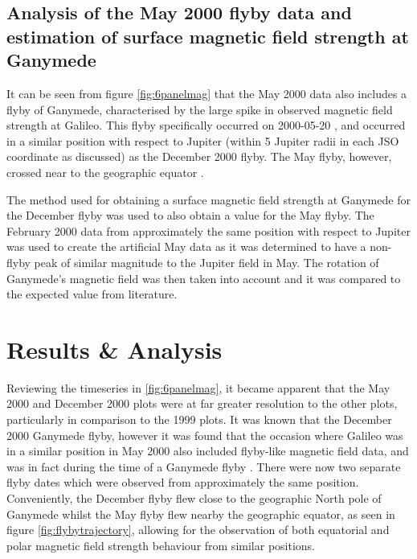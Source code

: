 \documentclass[11pt]{article}
\begin{document}
\subsection{Analysis of the May 2000 flyby data and estimation of surface magnetic field strength at Ganymede}
It can be seen from figure \ref{fig:6panelmag} that the May 2000 data also includes a flyby of Ganymede, characterised by the large spike in observed magnetic field strength at Galileo. This flyby specifically occurred on 2000-05-20 \cite{nasaflybys}, and occurred in a similar position with respect to Jupiter (within 5 Jupiter radii in each JSO coordinate as discussed) as the December 2000 flyby. The May flyby, however, crossed near to the geographic equator \cite{flybylines}.

The method used for obtaining a surface magnetic field strength at Ganymede for the December flyby was used to also obtain a value for the May flyby. The February 2000 data from approximately the same position with respect to Jupiter was used to create the artificial May data as it was determined to have a non-flyby peak of similar magnitude to the Jupiter field in May. The rotation of Ganymede's magnetic field was then taken into account and it was compared to the expected value from literature.

\section{Results \& Analysis}
\label{sec:result}

Reviewing the timeseries in \ref{fig:6panelmag}, it became apparent that the May 2000 and December 2000 plots were at far greater resolution to the other plots, particularly in comparison to the 1999 plots. It was known that the December 2000 Ganymede flyby, however it was found that the occasion where Galileo was in a similar position in May 2000 also included flyby-like magnetic field data, and was in fact during the time of a Ganymede flyby \cite{nasaflybys}. There were now two separate flyby dates which were observed from approximately the same position. Conveniently, the December flyby flew close to the geographic North pole of Ganymede whilst the May flyby flew nearby the geographic equator, as seen in figure \ref{fig:flybytrajectory}, allowing for the observation of both equatorial and polar magnetic field strength behaviour from similar positions.
\end{document}
